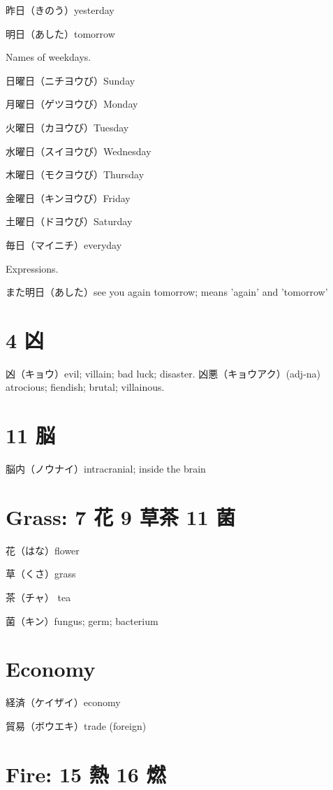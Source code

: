 昨日（きのう）yesterday

明日（あした）tomorrow

Names of weekdays.

日曜日（ニチヨウび）Sunday

月曜日（ゲツヨウび）Monday

火曜日（カヨウび）Tuesday

水曜日（スイヨウび）Wednesday

木曜日（モクヨウび）Thursday

金曜日（キンヨウび）Friday

土曜日（ドヨウび）Saturday

毎日（マイニチ）everyday

Expressions.

また明日（あした）see you again tomorrow; means 'again' and 'tomorrow'

\section{4 凶}

凶（キョウ）evil; villain; bad luck; disaster.
凶悪（キョウアク）(adj-na) atrocious; fiendish; brutal; villainous.

\section{11 脳}

脳内（ノウナイ）intracranial; inside the brain

\section{Grass: 7 花 9 草茶 11 菌}

花（はな）flower

草（くさ）grass

茶（チャ） tea

菌（キン）fungus; germ; bacterium

\section{Economy}

経済（ケイザイ）economy

貿易（ボウエキ）trade (foreign)

\section{Fire: 15 熱 16 燃}

